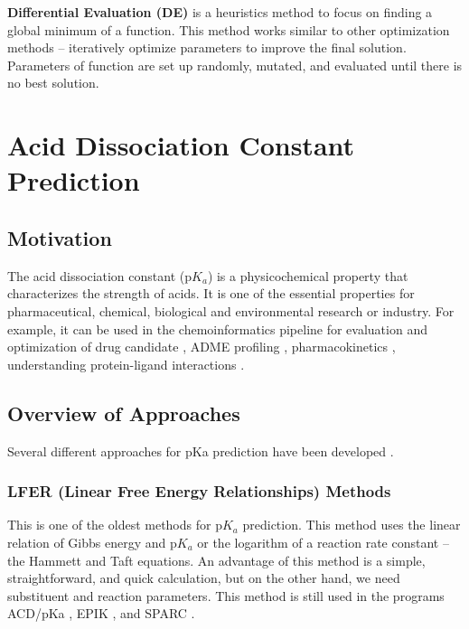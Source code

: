 \textbf{Differential Evaluation (DE)} \cite{Storn1997} is a heuristics method
to focus on finding a global minimum of a function. This method works similar
to other optimization methods -- iteratively optimize parameters to improve
the final solution. Parameters of function are set up randomly, mutated, and
evaluated until there is no best solution.

\chapter{Acid Dissociation Constant Prediction}

\section{Motivation}

The acid dissociation constant (p$K_a$) is a physicochemical property that
characterizes the strength of acids. It is one of the essential properties
for pharmaceutical, chemical, biological and environmental research or industry.
For example, it can be used in the chemoinformatics pipeline for evaluation and
optimization of drug candidate \cite{Ishihama2002, Babic2007, Manallack2007},
ADME profiling \cite{Wan2006, Cruciani2009}, pharmacokinetics \cite{Comer2001},
understanding protein-ligand interactions \cite{Klebe2000, Lee2009}.

\section{Overview of Approaches}

Several different approaches for pKa prediction have been
developed \cite{Lee2009, Rupp2010, Fraczkiewicz2006, Ho2010}. 

\subsection{LFER (Linear Free Energy Relationships) Methods}

This is one of the oldest methods \cite{Clark1964, Perrin1981} for p$K_a$
prediction. This method uses the linear relation of Gibbs energy and p$K_a$ or
the logarithm of a reaction rate constant -- the Hammett and Taft equations.
An advantage of this method is a simple, straightforward, and quick calculation,
but on the other hand, we need substituent and reaction parameters.
This method is still used in the programs ACD/pKa \cite{acd},
EPIK \cite{Shelley2008}, and SPARC \cite{Hillal1995}.

